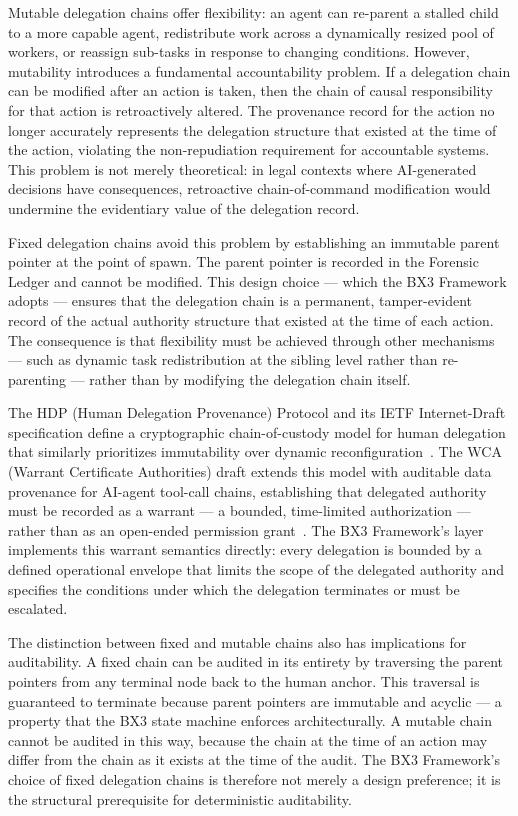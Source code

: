 Mutable delegation chains offer flexibility: an agent can re-parent a stalled child to a more capable agent, redistribute work across a dynamically resized pool of workers, or reassign sub-tasks in response to changing conditions. However, mutability introduces a fundamental accountability problem. If a delegation chain can be modified after an action is taken, then the chain of causal responsibility for that action is retroactively altered. The provenance record for the action no longer accurately represents the delegation structure that existed at the time of the action, violating the non-repudiation requirement for accountable systems. This problem is not merely theoretical: in legal contexts where AI-generated decisions have consequences, retroactive chain-of-command modification would undermine the evidentiary value of the delegation record.

Fixed delegation chains avoid this problem by establishing an immutable parent pointer at the point of spawn. The parent pointer is recorded in the Forensic Ledger and cannot be modified. This design choice — which the BX3 Framework adopts — ensures that the delegation chain is a permanent, tamper-evident record of the actual authority structure that existed at the time of each action. The consequence is that flexibility must be achieved through other mechanisms — such as dynamic task redistribution at the sibling level rather than re-parenting — rather than by modifying the delegation chain itself.

The HDP (Human Delegation Provenance) Protocol and its IETF Internet-Draft specification define a cryptographic chain-of-custody model for human delegation that similarly prioritizes immutability over dynamic reconfiguration~\cite{hdp2026,hdp2025ietf,hdp2025arxiv,draft-helixar-hdp}. The WCA (Warrant Certificate Authorities) draft extends this model with auditable data provenance for AI-agent tool-call chains, establishing that delegated authority must be recorded as a warrant — a bounded, time-limited authorization — rather than as an open-ended permission grant~\cite{wca-draft}. The BX3 Framework's \bounds{} layer implements this warrant semantics directly: every delegation is bounded by a defined operational envelope that limits the scope of the delegated authority and specifies the conditions under which the delegation terminates or must be escalated.

The distinction between fixed and mutable chains also has implications for auditability. A fixed chain can be audited in its entirety by traversing the parent pointers from any terminal node back to the human anchor. This traversal is guaranteed to terminate because parent pointers are immutable and acyclic — a property that the BX3 state machine enforces architecturally. A mutable chain cannot be audited in this way, because the chain at the time of an action may differ from the chain as it exists at the time of the audit. The BX3 Framework's choice of fixed delegation chains is therefore not merely a design preference; it is the structural prerequisite for deterministic auditability.

